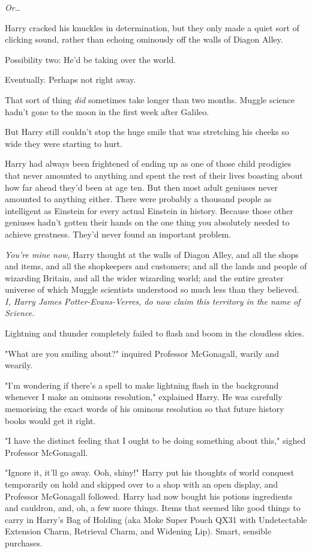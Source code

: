 \emph{Or}{\ldots}

Harry cracked his knuckles in determination, but they only made a quiet sort of 
clicking sound, rather than echoing ominously off the walls of Diagon Alley.

Possibility two: He'd be taking over the world.

Eventually. Perhaps not right away.

That sort of thing \emph{did} sometimes take longer than two months. Muggle 
science hadn't gone to the moon in the first week after Galileo.

But Harry still couldn't stop the huge smile that was stretching his cheeks so 
wide they were starting to hurt.

Harry had always been frightened of ending up as one of those child prodigies 
that never amounted to anything and spent the rest of their lives boasting 
about how far ahead they'd been at age ten. But then most adult geniuses never 
amounted to anything either. There were probably a thousand people as 
intelligent as Einstein for every actual Einstein in history. Because those 
other geniuses hadn't gotten their hands on the one thing you absolutely needed 
to achieve greatness. They'd never found an important problem.

\emph{You're mine now,} Harry thought at the walls of Diagon Alley, and all the 
shops and items, and all the shopkeepers and customers; and all the lands and 
people of wizarding Britain, and all the wider wizarding world; and the entire 
greater universe of which Muggle scientists understood so much less than they 
believed. \emph{I, Harry James Potter-Evans-Verres, do now claim this territory 
in the name of Science.}

Lightning and thunder completely failed to flash and boom in the cloudless 
skies.

"What are you smiling about?" inquired Professor McGonagall, warily and wearily.

"I'm wondering if there's a spell to make lightning flash in the background 
whenever I make an ominous resolution," explained Harry. He was carefully 
memorising the exact words of his ominous resolution so that future history 
books would get it right.

"I have the distinct feeling that I ought to be doing something about this," 
sighed Professor McGonagall.

"Ignore it, it'll go away. Ooh, shiny!" Harry put his thoughts of world 
conquest temporarily on hold and skipped over to a shop with an open display, 
and Professor McGonagall followed.
\sbreak
Harry had now bought his potions ingredients and cauldron, and, oh, a few more 
things. Items that seemed like good things to carry in Harry's Bag of Holding 
(aka Moke Super Pouch QX31 with Undetectable Extension Charm, Retrieval Charm, 
and Widening Lip). Smart, sensible purchases.

